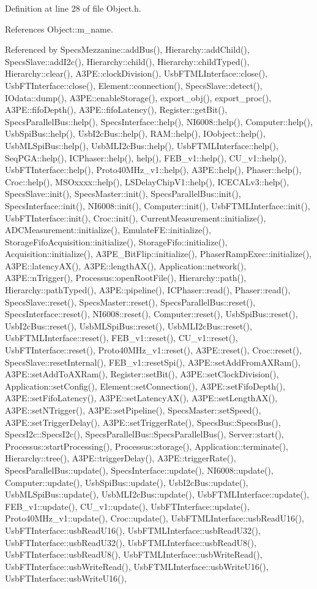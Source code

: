 Definition at line 28 of file Object.h.

References Object::m\_\-name.

Referenced by SpecsMezzanine::addBus(), Hierarchy::addChild(), SpecsSlave::addI2c(), Hierarchy::child(), Hierarchy::childTyped(), Hierarchy::clear(), A3PE::clockDivision(), UsbFTMLInterface::close(), UsbFTInterface::close(), Element::connection(), SpecsSlave::detect(), IOdata::dump(), A3PE::enableStorage(), export\_\-obj(), export\_\-proc(), A3PE::fifoDepth(), A3PE::fifoLatency(), Register::getBit(), SpecsParallelBus::help(), SpecsInterface::help(), NI6008::help(), Computer::help(), UsbSpiBus::help(), UsbI2cBus::help(), RAM::help(), IOobject::help(), UsbMLSpiBus::help(), UsbMLI2cBus::help(), UsbFTMLInterface::help(), SeqPGA::help(), ICPhaser::help(), help(), FEB\_\-v1::help(), CU\_\-v1::help(), UsbFTInterface::help(), Proto40MHz\_\-v1::help(), A3PE::help(), Phaser::help(), Croc::help(), MSOxxxx::help(), LSDelayChipV1::help(), ICECALv3::help(), SpecsSlave::init(), SpecsMaster::init(), SpecsParallelBus::init(), SpecsInterface::init(), NI6008::init(), Computer::init(), UsbFTMLInterface::init(), UsbFTInterface::init(), Croc::init(), CurrentMeasurement::initialize(), ADCMeasurement::initialize(), EmulateFE::initialize(), StorageFifoAcquisition::initialize(), StorageFifo::initialize(), Acquisition::initialize(), A3PE\_\-BitFlip::initialize(), PhaserRampExec::initialize(), A3PE::latencyAX(), A3PE::lengthAX(), Application::network(), A3PE::nTrigger(), Processus::openRootFile(), Hierarchy::path(), Hierarchy::pathTyped(), A3PE::pipeline(), ICPhaser::read(), Phaser::read(), SpecsSlave::reset(), SpecsMaster::reset(), SpecsParallelBus::reset(), SpecsInterface::reset(), NI6008::reset(), Computer::reset(), UsbSpiBus::reset(), UsbI2cBus::reset(), UsbMLSpiBus::reset(), UsbMLI2cBus::reset(), UsbFTMLInterface::reset(), FEB\_\-v1::reset(), CU\_\-v1::reset(), UsbFTInterface::reset(), Proto40MHz\_\-v1::reset(), A3PE::reset(), Croc::reset(), SpecsSlave::resetInternal(), FEB\_\-v1::resetSpi(), A3PE::setAddFromAXRam(), A3PE::setAddToAXRam(), Register::setBit(), A3PE::setClockDivision(), Application::setConfig(), Element::setConnection(), A3PE::setFifoDepth(), A3PE::setFifoLatency(), A3PE::setLatencyAX(), A3PE::setLengthAX(), A3PE::setNTrigger(), A3PE::setPipeline(), SpecsMaster::setSpeed(), A3PE::setTriggerDelay(), A3PE::setTriggerRate(), SpecsBus::SpecsBus(), SpecsI2c::SpecsI2c(), SpecsParallelBus::SpecsParallelBus(), Server::start(), Processus::startProcessing(), Processus::storage(), Application::terminate(), Hierarchy::tree(), A3PE::triggerDelay(), A3PE::triggerRate(), SpecsParallelBus::update(), SpecsInterface::update(), NI6008::update(), Computer::update(), UsbSpiBus::update(), UsbI2cBus::update(), UsbMLSpiBus::update(), UsbMLI2cBus::update(), UsbFTMLInterface::update(), FEB\_\-v1::update(), CU\_\-v1::update(), UsbFTInterface::update(), Proto40MHz\_\-v1::update(), Croc::update(), UsbFTMLInterface::usbReadU16(), UsbFTInterface::usbReadU16(), UsbFTMLInterface::usbReadU32(), UsbFTInterface::usbReadU32(), UsbFTMLInterface::usbReadU8(), UsbFTInterface::usbReadU8(), UsbFTMLInterface::usbWriteRead(), UsbFTInterface::usbWriteRead(), UsbFTMLInterface::usbWriteU16(), UsbFTInterface::usbWriteU16(), 